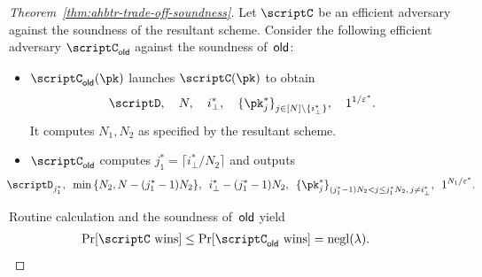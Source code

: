 \begin{proof}
[%
Theorem~\ref{thm:ahbtr-trade-off-soundness}]
Let $\scriptC$ be an efficient adversary against the soundness of the resultant scheme.
Consider the following efficient adversary $\scriptC_\OLD$ against the soundness of~$\OLD$:
\begin{itemize}
\item $\scriptC_\OLD(\pk)$ launches $\scriptC(\pk)$ to obtain
\begin{align*}
\scriptD,\quad
N,\quad
i^\ast_\bot,\quad
\{\pk^\ast_j\}_{j\in{[N]\setminus\{i^\ast_\bot\}}}^\sphantom,\quad
1^{1/\epsilon^\ast}.
\end{align*}
It computes $N_1,N_2$ as specified by the resultant scheme.
\item $\scriptC_\OLD$ computes ${j^\ast_1=\lceil i^\ast_\bot/N_2\rceil}$
and outputs
\begin{align*}
\hspace*{-2.2em}
\scriptD_{j^\ast_1},
\ \,
\min{\{N_2,N-(j^\ast_1-1)N_2\}},
\ \,
i^\ast_\bot-(j^\ast_1-1)N_2,
\ \,
\{\pk^\ast_j\}_{(j^\ast_1-1)N_2<j\leq j^\ast_1N_2,\,j\neq i^\ast_\bot}^\sphantom,
\ \,
1^{N_1/\epsilon^\ast}.
\end{align*}
\end{itemize}
Routine calculation and the soundness of~$\OLD$ yield
\begin{align*}
\Pr[\scriptC\textup{ wins}]
&{}\leq
\Pr[\scriptC_\OLD\textup{ wins}]
=
\negl(\lambda).
\qedhere
\end{align*}
\end{proof}
